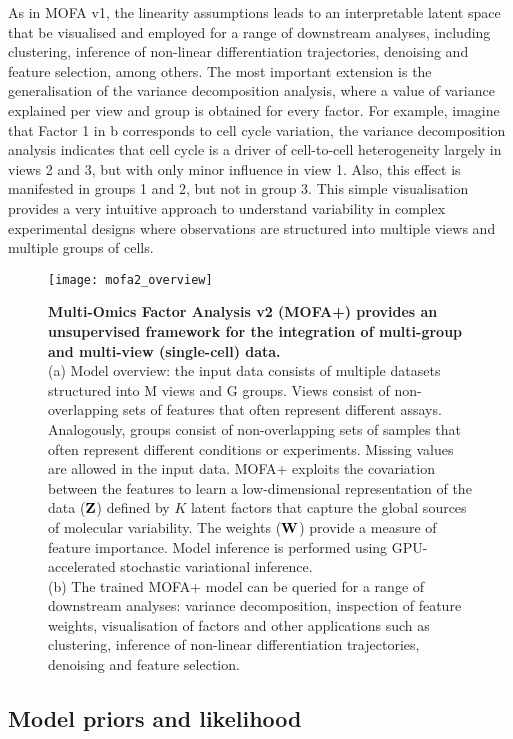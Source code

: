 As in MOFA v1, the linearity assumptions leads to an interpretable latent space that be visualised and employed for a range of downstream analyses, including clustering, inference of non-linear differentiation trajectories, denoising and feature selection, among others. The most important extension is the generalisation of the variance decomposition analysis, where a value of variance explained per view and group is obtained for every factor. For example, imagine that Factor 1 in b corresponds to cell cycle variation, the variance decomposition analysis indicates that cell cycle is a driver of cell-to-cell heterogeneity largely in views 2 and 3, but with only minor influence in view 1. Also, this effect is manifested in groups 1 and 2, but not in group 3. This simple visualisation provides a very intuitive approach to understand variability in complex experimental designs where observations are structured into multiple views and multiple groups of cells.

\begin{figure}[H]
	\centering
	\texttt{[image: mofa2\_overview]}
	\caption[]{\textbf{Multi-Omics Factor Analysis v2 (MOFA+) provides an unsupervised framework for the integration of multi-group and multi-view (single-cell) data.}\\
	(a) Model overview: the input data consists of multiple datasets structured into M views and G groups. Views consist of non-overlapping sets of features that often represent different assays. Analogously, groups consist of non-overlapping sets of samples that often represent different conditions or experiments. Missing values are allowed in the input data. MOFA+ exploits the covariation between the features to learn a low-dimensional representation of the data (${\bf Z}$) defined by $K$ latent factors that capture the global sources of molecular variability. The weights (${\bf W}$) provide a measure of feature importance. Model inference is performed using GPU-accelerated stochastic variational inference. \\
	(b) The trained MOFA+ model can be queried for a range of downstream analyses: variance decomposition, inspection of feature weights, visualisation of factors and other applications such as clustering, inference of non-linear differentiation trajectories, denoising and feature selection.
	}
	\label{fig:mofa2_overview}
\end{figure}


\subsection{Model priors and likelihood}


